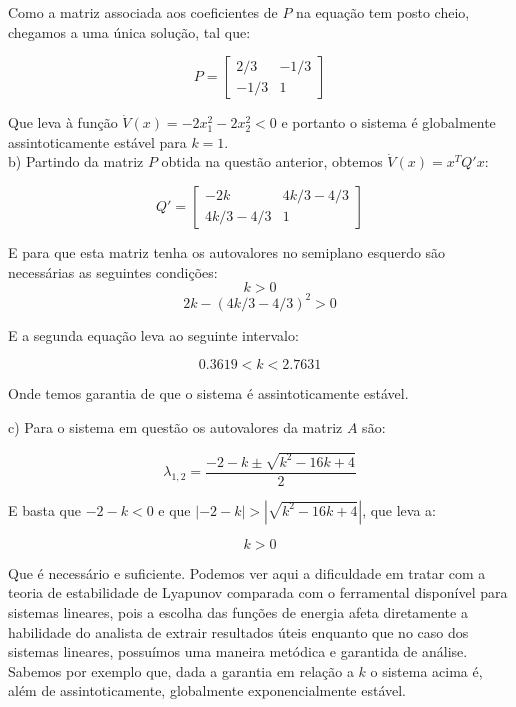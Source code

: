 Como a matriz associada aos coeficientes de $P$ na equação tem posto cheio, chegamos a uma única solução, tal que:

\[
P = \begin{bmatrix}
2/3 & -1/3\\
-1/3 & 1
\end{bmatrix}
\]

Que leva à função $\dot{V}(x) = -2x_1^2 -2x_2^2<0$ e portanto o sistema é globalmente assintoticamente estável para $k=1$.\\

b) Partindo da matriz $P$ obtida na questão anterior, obtemos $\dot{V}(x) = x^T Q' x$:

\[
Q' = \begin{bmatrix}
-2k & 4k/3 - 4/3\\
4k/3 - 4/3 & 1
\end{bmatrix}
\]

E para que esta matriz tenha os autovalores no semiplano esquerdo são necessárias as seguintes condições:
\begin{equation}
k>0
\end{equation}
\begin{equation}
2k - (4k/3 - 4/3)^2 > 0
\end{equation}

E a segunda equação leva ao seguinte intervalo:

\begin{equation}
0.3619<k<2.7631
\end{equation}

Onde temos garantia de que o sistema é assintoticamente estável.

c) Para o sistema em questão os autovalores da matriz $A$ são: 

\begin{equation}
\lambda_{1,2} = \frac{-2 - k \pm \sqrt{k^2 - 16k +4}}{2}
\end{equation}

E basta que $-2 -k<0$ e que $|-2-k|>|\sqrt{k^2 - 16k +4}|$, que leva a:

\begin{equation}
k>0
\end{equation}

Que é necessário e suficiente. Podemos ver aqui a dificuldade em tratar com a teoria de estabilidade de Lyapunov comparada com o ferramental disponível para sistemas lineares, pois a escolha das funções de energia afeta diretamente a habilidade do analista de extrair resultados úteis enquanto que no caso dos sistemas lineares, possuímos uma maneira metódica e garantida de análise. Sabemos por exemplo que, dada a garantia em relação a $k$ o sistema acima é, além de assintoticamente, globalmente exponencialmente estável.  

